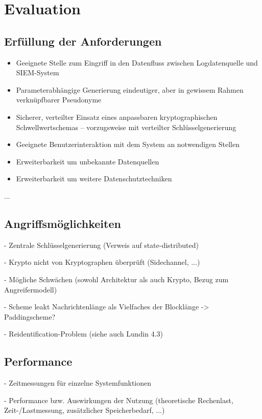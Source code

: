 \section{Evaluation}

\label{sec_impl_evaluation}

\subsection{Erfüllung der Anforderungen}

\begin{itemize}
  \item Geeignete Stelle zum Eingriff in den Datenfluss zwischen Logdatenquelle und SIEM-System
  \item Parameterabhängige Generierung eindeutiger, aber in gewissem Rahmen verknüpfbarer Pseudonyme
  \item Sicherer, verteilter Einsatz eines anpassbaren kryptographischen Schwellwertschemas -- vorzugsweise mit verteilter Schlüsselgenerierung
  \item Geeignete Benutzerinteraktion mit dem System an notwendigen Stellen
  \item Erweiterbarkeit um unbekannte Datenquellen
  \item Erweiterbarkeit um weitere Datenschutztechniken
\end{itemize}

...

\subsection{Angriffsmöglichkeiten}

- Zentrale Schlüsselgenerierung (Verweis auf state-distributed)

- Krypto nicht von Kryptographen überprüft (Sidechannel, ...)

- Mögliche Schwächen (sowohl Architektur als auch Krypto, Bezug zum Angreifermodell)

- Scheme leakt Nachrichtenlänge als Vielfaches der Blocklänge -> Paddingscheme?

- Reidentification-Problem (siehe auch Lundin 4.3)

\subsection{Performance}

- Zeitmessungen für einzelne Systemfunktionen

- Performance bzw. Auswirkungen der Nutzung (theoretische Rechenlast, Zeit-/Lastmessung, zusätzlicher Speicherbedarf, ...)